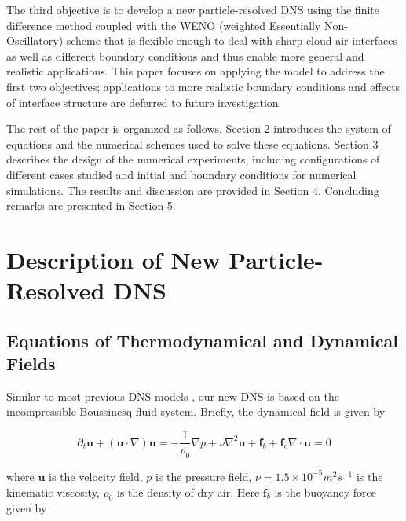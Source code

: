 \documentclass[draft,linenumbers]{agujournal}
\begin{document}
{\color{green}The third objective is to develop a new particle-resolved DNS using the finite difference method coupled with the WENO (weighted Essentially Non-Oscillatory) scheme \citep{JiangShu1996} that is flexible enough to deal with sharp cloud-air interfaces as well as different boundary conditions and thus enable more general and realistic applications. This paper focuses on applying the model to address the first two objectives; applications to more realistic boundary conditions and effects of interface structure are deferred to future investigation.}

The rest of the paper is organized as follows. Section 2 introduces the system of equations and the numerical schemes used to solve these equations. Section 3 describes the design of the numerical experiments, including configurations of different cases studied and initial and boundary conditions for numerical simulations. The results and discussion are provided in Section 4. Concluding remarks are presented in Section 5. 

\section{Description of New Particle-Resolved DNS}\label{particle_dns}

\subsection{Equations of Thermodynamical and Dynamical Fields}

Similar to most previous DNS models \citep[e.g.,][]{And04}, our new DNS is based on the incompressible Boussinesq fluid system. Briefly, the dynamical field is given by

\begin{subequations}

\begin{equation}
\partial_{t}\mathbf{u}+(\mathbf{u}\cdot\nabla)\mathbf{u}=-\frac{1}{\rho_{0}}\nabla p+\nu\nabla^2 \mathbf{u}+\mathbf{f}_b + \mathbf{f}_e\label{eq:NS1}
\end{equation}


\begin{equation}
\nabla\cdot \mathbf{u}=0\label{eq:NS2}
\end{equation}

\end{subequations}

where $\mathbf{u}$ is the velocity field, $p$ is the pressure field, $\nu = 1.5\times 10^{-5}m^2s^{-1}$ is the {\color{green}kinematic} viscosity, $\rho_{0}$ is the density of dry air. Here $\mathbf{f}_b$ is the buoyancy force given by 
\end{document}
